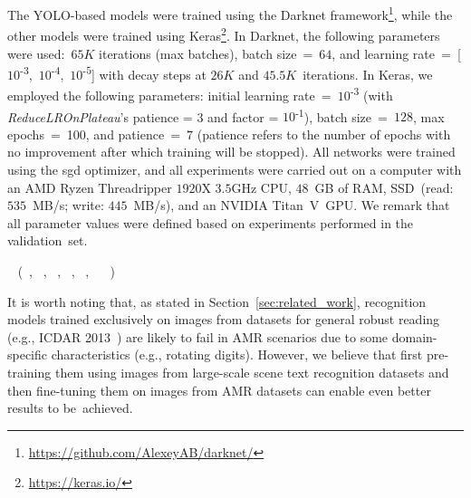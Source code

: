 The YOLO-based models were trained using the Darknet framework\footnote{\url{https://github.com/AlexeyAB/darknet/}}, while the other models were trained using Keras\footnote{\url{https://keras.io/}}. 
In Darknet, the following parameters were used:~$65K$ iterations (max batches), batch size~=~$64$, and learning rate~=~[$10$\textsuperscript{-$3$},~$10$\textsuperscript{-$4$},~$10$\textsuperscript{-$5$}] with decay steps at $26K$ and $45.5K$~iterations.
In Keras, we employed the following parameters: initial learning rate~=~$10$\textsuperscript{-$3$} (with \textit{ReduceLROnPlateau}'s patience = 3 and factor = $10$\textsuperscript{-$1$}), batch size~=~$128$, max epochs~=~100, and patience~=~$7$ (patience refers to the number of epochs with no improvement after which training will be stopped).
All networks were trained using the \gls*{sgd} optimizer, and all experiments were carried out on a computer with an AMD Ryzen Threadripper $1920$X $3.5$GHz CPU, $48$~GB of RAM, SSD~(read: $535$~MB/s; write: $445$~MB/s), and an NVIDIA Titan~V~GPU. 
We remark that all parameter values were defined based on experiments performed in the validation~set.

~\cite{clovaai} (~\cite{shi2017endtoend}, ~\cite{shi2016robust}, ~\cite{lee2016recursive}, ~\cite{liu2016starnet}, ~\cite{wang2017deep}, ~\cite{borisyuk2018rosetta} ~\cite{baek2019what})~\cite{shi2017endtoend}~\cite{baek2019what}


It is worth noting that, as stated in Section~\ref{sec:related_work}, recognition models trained exclusively on images from datasets for general robust reading (e.g., ICDAR 2013~\cite{karatzas2013icdar}) are likely to fail in AMR scenarios due to some domain-specific characteristics (e.g., rotating digits).
However, we believe that first pre-training them using images from large-scale scene text recognition datasets and then fine-tuning them on images from AMR datasets can enable  even better results to be~achieved.


